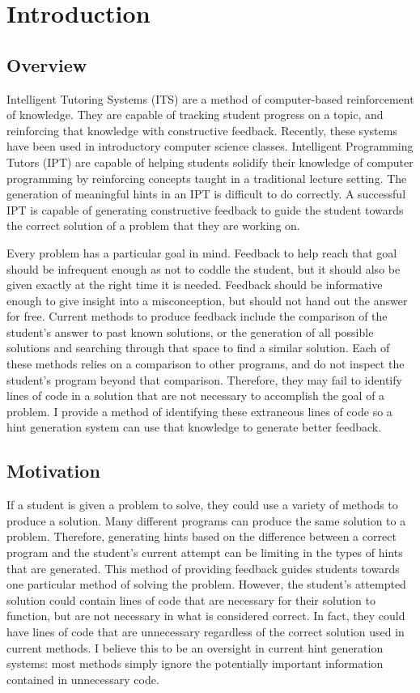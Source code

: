 \renewcommand{\thechapter}{1}

\chapter{Introduction}
\section{Overview}

Intelligent Tutoring Systems (ITS) are a method of computer-based reinforcement of knowledge. They are capable of tracking student progress on a topic, and reinforcing that knowledge with constructive feedback. Recently, these systems have been used in introductory computer science classes. Intelligent Programming Tutors (IPT) are capable of helping students solidify their knowledge of computer programming by reinforcing concepts taught in a traditional lecture setting. The generation of meaningful hints in an IPT is difficult to do correctly. A successful IPT is capable of generating constructive feedback to guide the student towards the correct solution of a problem that they are working on.

Every problem has a particular goal in mind. Feedback to help reach that goal should be infrequent enough as not to coddle the student, but it should also be given exactly at the right time it is needed. Feedback should be informative enough to give insight into a misconception, but should not hand out the answer for free. Current methods to produce feedback include the comparison of the student's answer to past known solutions, or the generation of all possible solutions and searching through that space to find a similar solution. Each of these methods relies on a comparison to other programs, and do not inspect the student's program beyond that comparison. Therefore, they may fail to identify lines of code in a solution that are not necessary to accomplish the goal of a problem. I provide a method of identifying these extraneous lines of code so a hint generation system can use that knowledge to generate better feedback.

\section{Motivation}

If a student is given a problem to solve, they could use a variety of methods to produce a solution. Many different programs can produce the same solution to a problem. Therefore, generating hints based on the difference between a correct program and the student's current attempt can be limiting in the types of hints that are generated. This method of providing feedback guides students towards one particular method of solving the problem. However, the student's attempted solution could contain lines of code that are necessary for their solution to function, but are not necessary in what is considered correct. In fact, they could have lines of code that are unnecessary regardless of the correct solution used in current methods. I believe this to be an oversight in current hint generation systems: most methods simply ignore the potentially important information contained in unnecessary code.

